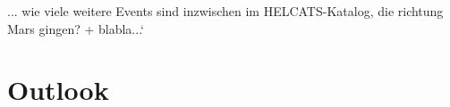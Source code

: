 

... wie viele weitere Events sind inzwischen im HELCATS-Katalog, die richtung Mars gingen? + blabla...`




\section{Outlook}